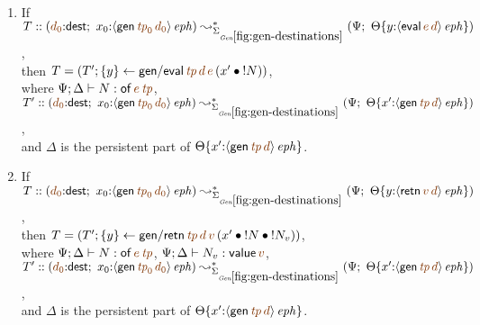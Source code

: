 \bigskip
\begin{lemma}~
\begin{enumerate}
\item If 
   $T :: (\lf{d_0}{:}{\sf dest}; ~
            x_0{:}\iseph{\susp{{\sf gen}\,\lf{{\it tp}_0}\,\lf{d_0}}})
         \leadsto^*_{\siggendests}
         (\Psi; ~
          \tackon{\Theta}
           {y{:}\iseph{\susp{{\sf eval}\,\lf{e}\,\lf{d}}}})$,
\\ then 
   $T = \left(T';
       \trstep{y}{{\sf gen/eval}\,\lf{{\it tp}}\,\lf{d}\,\lf{e}
       \,(\tfuser{x'}{\tbangr{N}})}\right)$,
\\ where
   $\Psi; \Delta \vdash N : {\sf of}\,\lf{e}\,\lf{{\it tp}}$,
\\ $T' :: (\lf{d_0}{:}{\sf dest}; ~
            x_0{:}\iseph{\susp{{\sf gen}\,\lf{{\it tp}_0}\,\lf{d_0}}})
         \leadsto^*_{\siggendests}
         (\Psi; ~
          \tackon{\Theta}
           {x'{:}\iseph{\susp{{\sf gen}\,\lf{{\it tp}}\,\lf{d}}}})$,
\\ and $\Delta$ is the persistent part of 
   $\tackon{\Theta}
           {x'{:}\iseph{\susp{{\sf gen}\,\lf{{\it tp}}\,\lf{d}}}}$.


\medskip
\item If 
   $T :: (\lf{d_0}{:}{\sf dest}; ~
            x_0{:}\iseph{\susp{{\sf gen}\,\lf{{\it tp}_0}\,\lf{d_0}}})
         \leadsto^*_{\siggendests}
         (\Psi; ~
          \tackon{\Theta}
           {y{:}\iseph{\susp{{\sf retn}\,\lf{v}\,\lf{d}}}})$,
\\ then 
   $T = \left(T';
       \trstep{y}{{\sf gen/retn}\,\lf{{\it tp}}\,\lf{d}\,\lf{v}
       \,(\tfuser{x'}{\tfuser{\tbangr{N}}{\tbangr{N_v}}})}\right)$,
\\ where
   $\Psi; \Delta \vdash N : {\sf of}\,\lf{e}\,\lf{{\it tp}}$,
   $\Psi; \Delta \vdash N_v : {\sf value}\,\lf{v}$, 
\\ $T' :: (\lf{d_0}{:}{\sf dest}; ~
            x_0{:}\iseph{\susp{{\sf gen}\,\lf{{\it tp}_0}\,\lf{d_0}}})
         \leadsto^*_{\siggendests}
         (\Psi; ~
          \tackon{\Theta}
           {x'{:}\iseph{\susp{{\sf gen}\,\lf{{\it tp}}\,\lf{d}}}})$,
\\ and $\Delta$ is the persistent part of 
   $\tackon{\Theta}
           {x'{:}\iseph{\susp{{\sf gen}\,\lf{{\it tp}}\,\lf{d}}}}$.



\end{enumerate}
\end{lemma}
